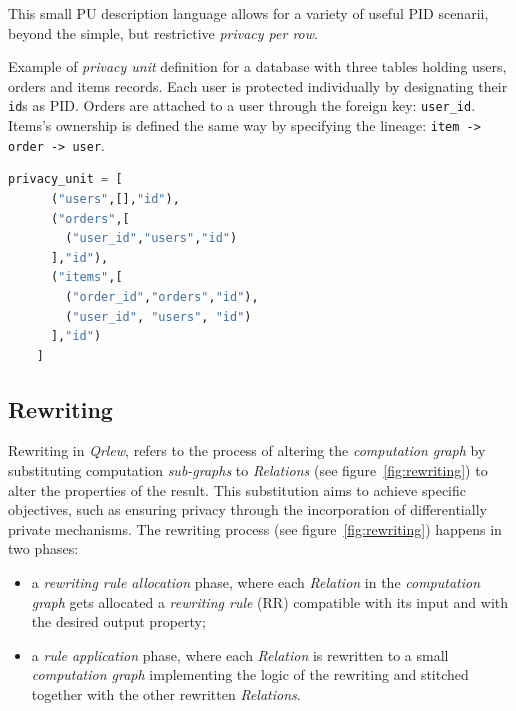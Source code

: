 \documentclass{article}
\newcommand{\qrlew}{\emph{Qrlew}}
\begin{document}
    This small PU description language allows for a variety of useful PID scenarii, beyond the simple, but restrictive \emph{privacy per row}.
    
    \begin{listing}[tb]
    \caption{Example of \emph{privacy unit} definition for a database with three tables holding users, orders and items records. Each user is protected individually by designating their \texttt{id}s as PID. Orders are attached to a user through the foreign key: \texttt{user\_id}. Items's ownership is defined the same way by specifying the lineage: \texttt{item -> order -> user}.}%
    \label{lst:pe}
    \begin{lstlisting}[language=Python]
    privacy_unit = [
      ("users",[],"id"),
      ("orders",[
        ("user_id","users","id")
      ],"id"),
      ("items",[
        ("order_id","orders","id"),
        ("user_id", "users", "id")
      ],"id")
    ]
    \end{lstlisting}
    \end{listing}
    
    \subsection{Rewriting}
    \label{sec:rewritting}
    
    Rewriting in \qrlew{}, refers to the process of altering the \emph{computation graph} by substituting computation \emph{sub-graphs} to \emph{Relations} (see figure~\ref{fig:rewriting}) to alter the properties of the result. This substitution aims to achieve specific objectives, such as ensuring privacy through the incorporation of differentially private mechanisms. The rewriting process (see figure~\ref{fig:rewriting}) happens in two phases:
    \begin{itemize}
        \item a \emph{rewriting rule allocation} phase, where each \emph{Relation} in the \emph{computation graph} gets allocated a \emph{rewriting rule} (RR) compatible with its input and with the desired output property;
        \item a \emph{rule application} phase, where each \emph{Relation} is rewritten to a small \emph{computation graph} implementing the logic of the rewriting and stitched together with the other rewritten \emph{Relations}.
    \end{itemize}
    
\end{document}
